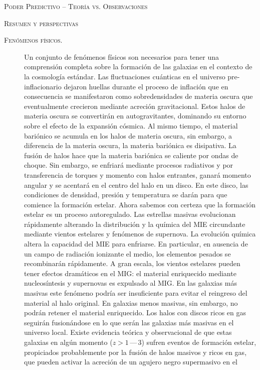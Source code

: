 \documentclass[xcolor=dvipsnames,4pt,hyperref={colorlinks,citecolor=black,linkcolor=black,urlcolor=black}]{beamer}
\begin{document}
\begin{frame}[allowframebreaks]{\textsc{Poder Predictivo -- Teoría vs. Observaciones}}
\end{frame}

\begin{frame}[allowframebreaks]{\textsc{Resumen y perspectivas}}
%
\begin{description}
%
\item[\textsc{Fenómenos físicos.}] Un conjunto de fenómenos físicos son necesarios para tener una
comprensión completa sobre la formación de las galaxias en el contexto de la cosmología estándar.
Las fluctuaciones cuánticas en el universo pre-inflacionario dejaron huellas durante el proceso de
inflación que en consecuencia se manifestaron como sobredensidades de materia oscura que
eventualmente crecieron mediante acreción gravitacional. Estos halos de materia oscura se
convertirán en autogravitantes, dominando su entorno sobre el efecto de la expansión cósmica. Al
mismo tiempo, el material bariónico se acumula en los halos de materia oscura, sin embargo, a
diferencia de la materia oscura, la materia bariónica es disipativa. La fusión de halos hace que la
materia bariónica se caliente por ondas de choque. Sin embargo, se enfriará mediante procesos
radiativos y por transferencia de torques y momento con halos entrantes, ganará momento angular y se
acentará en el centro del halo en un disco. En este disco, las condiciones de densidad, presión y
temperatura se darán para que comience la formación estelar. Ahora sabemos con certeza que la
formación estelar es un proceso autoregulado. Las estrellas masivas evolucionan rápidamente
alterando la distribución y la química del MIE circundante mediante vientos estelares y fenómenos de
supernova. La evolución química altera la capacidad del MIE para enfriarse. En particular, en
ausencia de un campo de radiación ionizante el medio, los elementos pesados se recombinarán
rápidamente. A gran escala, los vientos estelares pueden tener efectos dramáticos en el MIG: el
material enriquecido mediante nucleosíntesis y supernovas es expulsado al MIG. En las galaxias más
masivas este fenómeno podría ser insuficiente para evitar el reingreso del material al halo
original. En galaxias menos masivas, sin embargo, no podrán retener el material enriquecido. Los
halos con discos ricos en gas seguirán fusionándose en lo que serán las galaxias más masivas en el
universo local. Existe evidencia teórica y observacional de que estas galaxias en algún momento
($z>1\,$---$\,3$) sufren eventos de formación estelar, propiciados probablemente por la fusión de
halos masivos y ricos en gas, que pueden activar la acreción de un agujero negro supermasivo en el

\end{description}
\end{frame}
\end{document}
